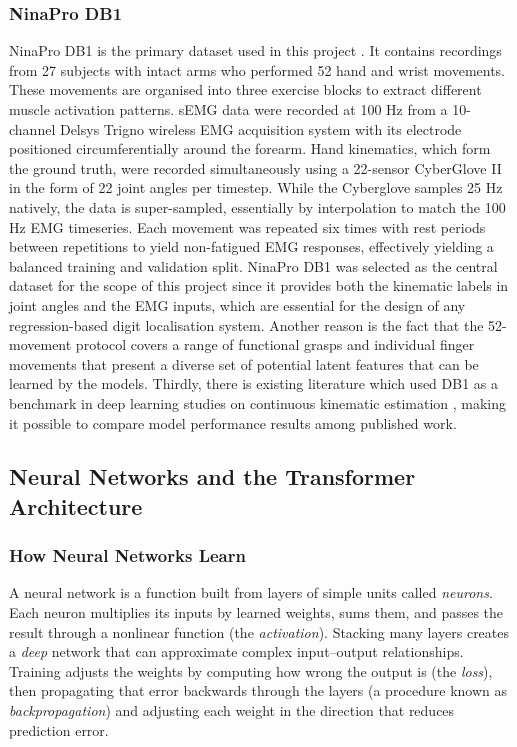\documentclass[11pt]{article}
\begin{document}
\subsubsection{NinaPro DB1}
NinaPro DB1 is the primary dataset used in this project \cite{ninaprodb1}. It contains recordings from 27 subjects with intact arms who performed 52 hand and wrist movements. These movements are organised into three exercise blocks to extract different muscle activation patterns. sEMG data were recorded at 100 Hz from a 10-channel Delsys Trigno wireless EMG acquisition system with its electrode positioned circumferentially around the forearm. Hand kinematics, which form the ground truth, were recorded simultaneously using a 22-sensor CyberGlove II in the form of 22 joint angles per timestep. While the Cyberglove samples 25 Hz natively, the data is super-sampled, essentially by interpolation to match the 100 Hz EMG timeseries.
 Each movement was repeated six times with rest periods between repetitions to yield non-fatigued EMG responses, effectively yielding a balanced training and validation split. NinaPro DB1 was selected as the central dataset for the scope of this project since it provides both the kinematic labels in joint angles and the EMG inputs, which are essential for the design of any regression-based digit localisation system. 
Another reason is the fact that the 52-movement protocol covers a range of functional grasps and individual finger movements that present a diverse set of potential latent features that can be learned by the models. Thirdly, there is existing literature which used DB1 as a benchmark in deep learning studies on continuous kinematic estimation \cite{jiang2024efficient,lin2025parallel}, making it possible to compare model performance results among published work.



\subsection{Neural Networks and the Transformer Architecture}
\label{sec:nn_background}


\subsubsection{How Neural Networks Learn}
A neural network is a function built from layers of simple units called \emph{neurons}. Each neuron multiplies its inputs by learned weights, sums them, and passes the result through a nonlinear function (the \emph{activation}). Stacking many layers creates a \emph{deep} network that can approximate complex input--output relationships. Training adjusts the weights by computing how wrong the output is (the \emph{loss}), then propagating that error backwards through the layers (a procedure known as \emph{backpropagation}) and adjusting each weight in the direction that reduces prediction error.
\end{document}
